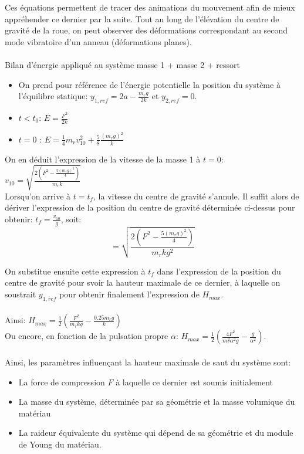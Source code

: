 Ces équations permettent de tracer des animations du mouvement afin de mieux appréhender ce dernier par la suite. Tout au long de l'élévation du centre de gravité de la roue, on peut observer des déformations correspondant au second mode vibratoire d'un anneau (déformations planes).
\\ 
\\
Bilan d'énergie appliqué au système {masse 1 + masse 2 + ressort}
\begin{itemize}
    \item On prend pour référence de l'énergie potentielle la position du système à l'équilibre statique: $y_{1,ref}=2a-\frac{m_r g}{2k}$ et $y_{2,ref}=0$.
    \item $t<t_0$: $E=\frac{F^2}{2k}$
    \item $t=0$ : $E=\frac{1}{4}m_r v_{10}^2 +\frac{5}{8}\frac{(m_r g)^2}{k} $
\end{itemize}

On en déduit l'expression de la vitesse de la masse 1 à $t=0$: $v_{10}=\sqrt{\frac{2(F^2-\frac{5(m_r g)^2}{4})}{m_r k}}$ \\

Lorsqu'on arrive à $t=t_f$, la vitesse du centre de gravité s'annule. Il suffit alors de dériver l'expression de la position du centre de gravité déterminée ci-dessus pour obtenir: $t_f=\frac{v_{10}}{g}$, soit: 
$$ =\sqrt{\frac{2(F^2-\frac{5(m_r g)^2}{4})}{m_r k g^2}}$$

On substitue ensuite cette expression à $t_f$ dans l'expression de la position du centre de gravité pour svoir la hauteur maximale de ce dernier, à laquelle on soustrait $y_{1,ref}$ pour obtenir finalement l'expression de $H_{max}$.
\\ \\
Ainsi: $H_{max}=\frac{1}{2}(\frac{F^2}{m_r k g}-\frac{0.25m_r g}{k})$
\\
Ou encore, en fonction de la pulsation propre $\alpha$: $H_{max}=\frac{1}{2}(\frac{4F^2}{m_r^2\alpha^2 g}-\frac{g}{\alpha^2})$.
\\ \\
Ainsi, les paramètres influençant la hauteur maximale de saut du système sont:
\begin{itemize}
    \item La force de compression $F$ à laquelle ce dernier est soumis initialement
    \item La masse du système, déterminée par sa géométrie et la masse volumique du matériau
    \item La raideur équivalente du système qui dépend de sa géométrie et du module de Young du matériau.
\end{itemize}

